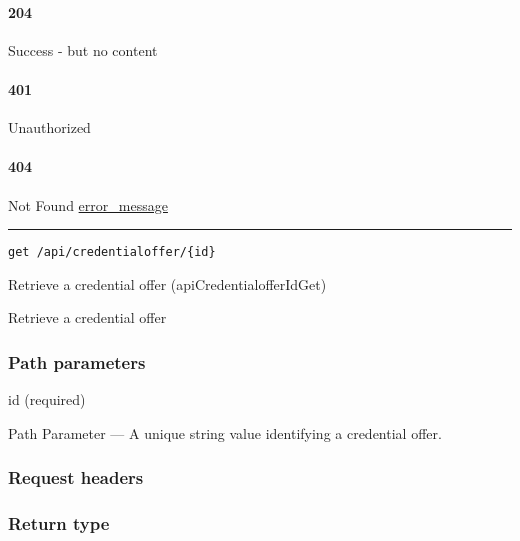 \hypertarget{section-216}{%
\paragraph{204}\label{section-216}}

Success - but no content \protect\hyperlink{}{}

\hypertarget{section-217}{%
\paragraph{401}\label{section-217}}

Unauthorized \protect\hyperlink{}{}

\hypertarget{section-218}{%
\paragraph{404}\label{section-218}}

Not Found \protect\hyperlink{error_message}{error\_message}

\begin{center}\rule{0.5\linewidth}{\linethickness}\end{center}

\protect\hypertarget{apiCredentialofferIdGet}{}{}

\begin{verbatim}
get /api/credentialoffer/{id}
\end{verbatim}

Retrieve a credential offer ({apiCredentialofferIdGet})

Retrieve a credential offer

\hypertarget{path-parameters-33}{%
\subsubsection{Path parameters}\label{path-parameters-33}}

id (required)

{Path Parameter} --- A unique string value identifying a credential
offer.

\hypertarget{request-headers-37}{%
\subsubsection{Request headers}\label{request-headers-37}}

\hypertarget{return-type-53}{%
\subsubsection{Return type}\label{return-type-53}}

